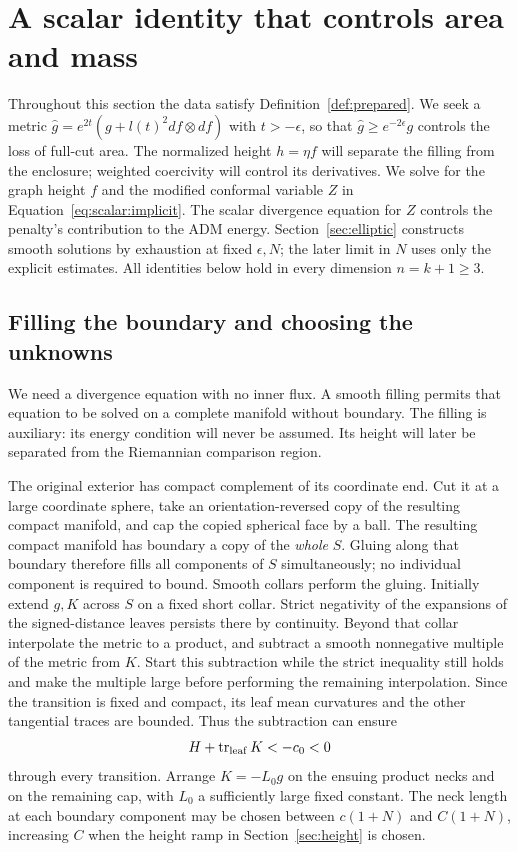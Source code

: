 \section{A scalar identity that controls area and mass}
\label{sec:scalar}
\label{sec:scalar:construction}

Throughout this section the data satisfy Definition~\ref{def:prepared}.  We seek a metric
$\widehat g=e^{2t}(g+l(t)^2df\otimes df)$ with
$t>-\epsilon$, so that $\widehat g\ge e^{-2\epsilon}g$ controls
the loss of full-cut area.  The normalized height $h=\eta f$ will
separate the filling from the enclosure; weighted coercivity will
control its derivatives.  We solve for the graph height $f$ and the
modified conformal variable $Z$ in Equation~\eqref{eq:scalar:implicit}.
The scalar divergence equation for $Z$ controls the penalty's
contribution to the ADM energy.  Section~\ref{sec:elliptic} constructs
smooth solutions by exhaustion at fixed $\epsilon,N$; the later limit
in $N$ uses only the explicit estimates.  All identities below hold
in every dimension $n=k+1\geq3$.

\subsection{Filling the boundary and choosing the unknowns}

We need a divergence equation with no inner flux. A smooth filling permits
that equation to be solved on a complete manifold without boundary. The
filling is auxiliary: its energy condition will never be assumed. Its
height will later be separated from the Riemannian comparison region.


The original exterior has compact complement of its coordinate end.
Cut it at a large coordinate sphere, take an orientation-reversed copy
of the resulting compact manifold, and cap the copied spherical face by
a ball.  The resulting compact manifold has boundary a copy of the
\emph{whole} $S$.  Gluing along that boundary therefore fills all
components of $S$ simultaneously; no individual component is required
to bound.  Smooth collars perform the gluing.  Initially extend $g,K$
across $S$ on a fixed short collar.  Strict negativity of the expansions
of the signed-distance leaves persists there by continuity.  Beyond
that collar interpolate the metric to a product, and subtract a smooth
nonnegative multiple of the metric from $K$.  Start this subtraction
while the strict inequality still holds and make the multiple large
before performing the remaining interpolation.  Since the transition
is fixed and compact, its leaf mean curvatures and the other tangential
traces are bounded.  Thus the subtraction can ensure
\[
 H+\operatorname{tr}_{\mathrm{leaf}}K<-c_0<0
\]
through every transition.  Arrange $K=-L_0g$ on the ensuing product
necks and on the remaining cap, with $L_0$ a sufficiently large fixed
constant.  The neck length at each boundary component may be chosen
between $c(1+N)$ and $C(1+N)$, increasing $C$ when the height ramp in
Section~\ref{sec:height} is chosen.

